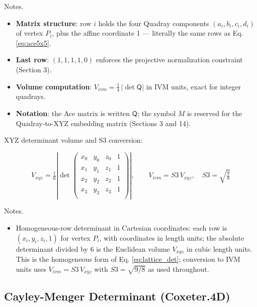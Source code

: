 \documentclass[
  10pt,
]{article}
\providecommand{\tightlist}{%
  \setlength{\itemsep}{0pt}\setlength{\parskip}{0pt}}
\begin{document}
Notes.

\begin{itemize}
\tightlist
\item
  \textbf{Matrix structure}: row \(i\) holds the four Quadray components
  \((a_i, b_i, c_i, d_i)\) of vertex \(P_i\), plus the affine coordinate
  1 --- literally the same rows as Eq. \eqref{eq:ace5x5}.
\item
  \textbf{Last row}: \((1,1,1,1,0)\) enforces the projective
  normalization constraint (Section 3).
\item
  \textbf{Volume computation}:
  \(V_{ivm} = \tfrac{1}{4}\,\big|\det \mathsf{Q}\big|\) in IVM units,
  exact for integer quadrays.
\item
  \textbf{Notation}: the Ace matrix is written \(\mathsf{Q}\); the
  symbol \(M\) is reserved for the Quadray-to-XYZ embedding matrix
  (Sections 3 and 14).
\end{itemize}

XYZ determinant volume and S3 conversion:

\begin{equation}\label{eq:xyz_det}
V_{xyz} = \tfrac{1}{6} \left| \det \begin{pmatrix}
 x_0 & y_0 & z_0 & 1 \\
 x_1 & y_1 & z_1 & 1 \\
 x_2 & y_2 & z_2 & 1 \\
 x_3 & y_3 & z_3 & 1 \\
\end{pmatrix} \right|, \qquad V_{ivm} = S3\, V_{xyz},\quad S3=\sqrt{\tfrac{9}{8}}
\end{equation}

Notes.

\begin{itemize}
\tightlist
\item
  Homogeneous-row determinant in Cartesian coordinates: each row is
  \((x_i, y_i, z_i, 1)\) for vertex \(P_i\), with coordinates in length
  units; the absolute determinant divided by 6 is the Euclidean volume
  \(V_{xyz}\) in cubic length units. This is the homogeneous form of Eq.
  \eqref{eq:lattice_det}; conversion to IVM units uses
  \(V_{ivm} = S3\,V_{xyz}\) with \(S3=\sqrt{9/8}\) as used throughout.
\end{itemize}

\subsection{Cayley-Menger Determinant
(Coxeter.4D)}\label{cayley-menger-determinant-coxeter.4d}
\end{document}
